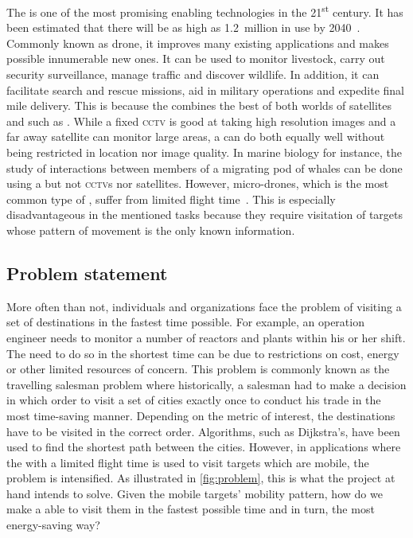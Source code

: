 \documentclass[../main.tex]{subfiles}
\begin{document}
The \uav is one of the most promising enabling technologies in the 
21\textsuperscript{st} century. It has been estimated that
there will be as high as \SI{1.2}{million} \uavs in use 
by 2040~\cite{Amo19}. 
Commonly known as drone, 
it improves many existing applications and makes possible 
innumerable new ones. It can be used to monitor livestock, 
carry out security surveillance, manage traffic 
and discover wildlife.
In addition, it can facilitate search and rescue missions,
aid in military operations and expedite final mile delivery.
This is because the \uav combines the best of both worlds
of satellites and \csns such as \cctvs.
While a fixed \textsc{cctv} is good at taking 
high resolution images and a far away satellite can monitor
large areas, a \uav can do both equally well without 
being restricted in location nor image quality. 
In marine biology for instance,  
the study of interactions between members of a migrating 
pod of whales can be done using a \uav but not 
\textsc{cctv}s nor satellites.
However, micro-drones, which is the most common type of \uavs,
suffer from limited flight time~\cite{Sha19}. 
This is especially disadvantageous in
the mentioned tasks because they require visitation of targets
whose pattern of movement is the only known information.

\subsection{Problem statement}

More often than not, individuals and organizations face the problem
of visiting a set of destinations in the fastest time 
possible.
For example, an operation engineer needs to monitor
a number of reactors and plants within his or her shift.
The need to do so in the shortest time can be due to restrictions on
cost, energy or other limited resources of concern.
This problem is commonly known as the travelling salesman problem
where historically, a salesman had to make a decision in which order
to visit a set of cities exactly once to conduct his trade
in the most time-saving manner.
Depending on the metric of interest, 
the destinations have to be visited in the correct order.
Algorithms, such as Dijkstra's, have been used 
to find the shortest path between the cities.
However, in applications where the \uav with a limited
flight time is used to 
visit targets which are mobile, the problem is intensified.
As illustrated in \cref{fig:problem}, this
is what the project at hand intends to solve.
Given the mobile targets' mobility pattern,
how do we make a \uav able to visit them
in the fastest possible time and in turn, 
the most energy-saving way?  
\end{document}
